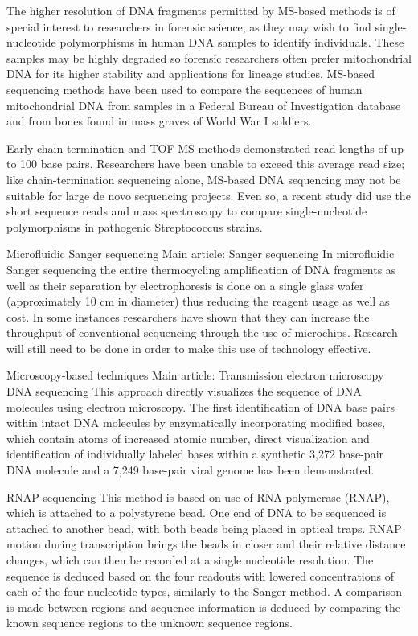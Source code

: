 The higher resolution of DNA fragments permitted by MS-based methods is of special interest to researchers in forensic science, as they may wish to find single-nucleotide polymorphisms in human DNA samples to identify individuals. These samples may be highly degraded so forensic researchers often prefer mitochondrial DNA for its higher stability and applications for lineage studies. MS-based sequencing methods have been used to compare the sequences of human mitochondrial DNA from samples in a Federal Bureau of Investigation database and from bones found in mass graves of World War I soldiers.

Early chain-termination and TOF MS methods demonstrated read lengths of up to 100 base pairs. Researchers have been unable to exceed this average read size; like chain-termination sequencing alone, MS-based DNA sequencing may not be suitable for large de novo sequencing projects. Even so, a recent study did use the short sequence reads and mass spectroscopy to compare single-nucleotide polymorphisms in pathogenic Streptococcus strains.

Microfluidic Sanger sequencing
Main article: Sanger sequencing
In microfluidic Sanger sequencing the entire thermocycling amplification of DNA fragments as well as their separation by electrophoresis is done on a single glass wafer (approximately 10 cm in diameter) thus reducing the reagent usage as well as cost. In some instances researchers have shown that they can increase the throughput of conventional sequencing through the use of microchips. Research will still need to be done in order to make this use of technology effective.

Microscopy-based techniques
Main article: Transmission electron microscopy DNA sequencing
This approach directly visualizes the sequence of DNA molecules using electron microscopy. The first identification of DNA base pairs within intact DNA molecules by enzymatically incorporating modified bases, which contain atoms of increased atomic number, direct visualization and identification of individually labeled bases within a synthetic 3,272 base-pair DNA molecule and a 7,249 base-pair viral genome has been demonstrated.

RNAP sequencing
This method is based on use of RNA polymerase (RNAP), which is attached to a polystyrene bead. One end of DNA to be sequenced is attached to another bead, with both beads being placed in optical traps. RNAP motion during transcription brings the beads in closer and their relative distance changes, which can then be recorded at a single nucleotide resolution. The sequence is deduced based on the four readouts with lowered concentrations of each of the four nucleotide types, similarly to the Sanger method. A comparison is made between regions and sequence information is deduced by comparing the known sequence regions to the unknown sequence regions.

